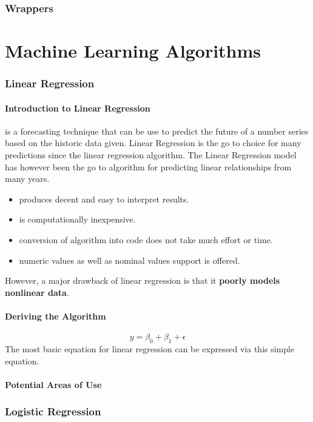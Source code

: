 \documentclass[12pt]{article}
\begin{document}
\section{Wrappers}
\newpage
\part{Machine Learning Algorithms}
\newpage
\section{Linear Regression}
\subsection{Introduction to Linear Regression}
 is a forecasting technique that can be use to predict the future of a number series based on the historic data given. Linear Regression is the go to choice for many predictions since the linear regression algorithm. The Linear Regression model has however been the go to algorithm for predicting linear relationships from many years.

\begin{itemize}
  \item produces decent and  easy to interpret results.
  \item is computationally inexpensive.
  \item conversion of algorithm into code does not take much effort or time.
  \item numeric values as well as nominal values support is offered.
\end{itemize}

However, a major drawback of linear regression is that it \textbf{poorly models nonlinear data}.
\subsection{Deriving the Algorithm}

\begin{equation}
y = \beta_{0}+\beta_{1}+\epsilon
\end{equation}
The most basic equation for linear regression can be expressed via this simple equation.
\subsection{Potential Areas of Use}
\newpage
\section{Logistic Regression}
\newpage
\end{document}
